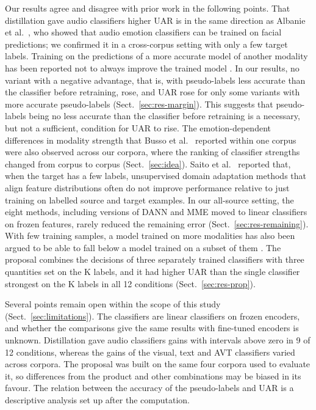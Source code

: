 Our results agree and disagree with prior work in the following points. That distillation gave audio classifiers higher UAR is in the same direction as Albanie et al.\ \cite{albanie2018}, who showed that audio emotion classifiers can be trained on facial predictions; we confirmed it in a cross-corpus setting with only a few target labels. Training on the predictions of a more accurate model of another modality has been reported not to always improve the trained model \cite{xue2023mfh}. In our results, no variant with a negative advantage, that is, with pseudo-labels less accurate than the classifier before retraining, rose, and UAR rose for only some variants with more accurate pseudo-labels (Sect.~\ref{sec:res-margin}). This suggests that pseudo-labels being no less accurate than the classifier before retraining is a necessary, but not a sufficient, condition for UAR to rise. The emotion-dependent differences in modality strength that Busso et al.\ \cite{busso2004} reported within one corpus were also observed across our corpora, where the ranking of classifier strengths changed from corpus to corpus (Sect.~\ref{sec:idea}). Saito et al.\ \cite{saito2019mme} reported that, when the target has a few labels, unsupervised domain adaptation methods that align feature distributions often do not improve performance relative to just training on labelled source and target examples. In our all-source setting, the eight methods, including versions of DANN and MME moved to linear classifiers on frozen features, rarely reduced the remaining error (Sect.~\ref{sec:res-remaining}). With few training samples, a model trained on more modalities has also been argued to be able to fall below a model trained on a subset of them \cite{huang2021}. The proposal combines the decisions of three separately trained classifiers with three quantities set on the K labels, and it had higher UAR than the single classifier strongest on the K labels in all 12 conditions (Sect.~\ref{sec:res-prop}).

Several points remain open within the scope of this study (Sect.~\ref{sec:limitations}). The classifiers are linear classifiers on frozen encoders, and whether the comparisons give the same results with fine-tuned encoders is unknown. Distillation gave audio classifiers gains with intervals above zero in 9 of 12 conditions, whereas the gains of the visual, text and AVT classifiers varied across corpora. The proposal was built on the same four corpora used to evaluate it, so differences from the product and other combinations may be biased in its favour. The relation between the accuracy of the pseudo-labels and UAR is a descriptive analysis set up after the computation.

